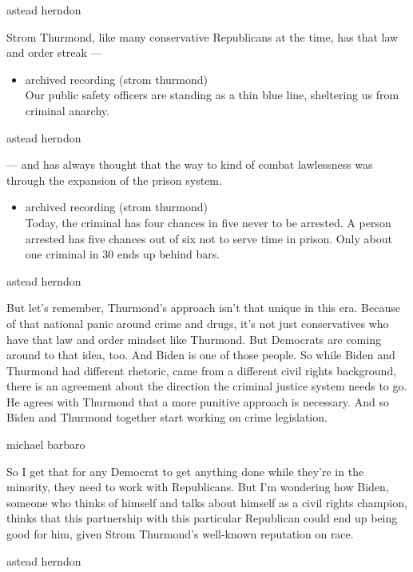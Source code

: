 astead herndon

Strom Thurmond, like many conservative Republicans at the time, has that
law and order streak ---

\begin{itemize}
\tightlist
\item
  archived recording (strom thurmond)\\
  Our public safety officers are standing as a thin blue line,
  sheltering us from criminal anarchy.
\end{itemize}

astead herndon

--- and has always thought that the way to kind of combat lawlessness
was through the expansion of the prison system.

\begin{itemize}
\tightlist
\item
  archived recording (strom thurmond)\\
  Today, the criminal has four chances in five never to be arrested. A
  person arrested has five chances out of six not to serve time in
  prison. Only about one criminal in 30 ends up behind bars.
\end{itemize}

astead herndon

But let's remember, Thurmond's approach isn't that unique in this era.
Because of that national panic around crime and drugs, it's not just
conservatives who have that law and order mindset like Thurmond. But
Democrats are coming around to that idea, too. And Biden is one of those
people. So while Biden and Thurmond had different rhetoric, came from a
different civil rights background, there is an agreement about the
direction the criminal justice system needs to go. He agrees with
Thurmond that a more punitive approach is necessary. And so Biden and
Thurmond together start working on crime legislation.

michael barbaro

So I get that for any Democrat to get anything done while they're in the
minority, they need to work with Republicans. But I'm wondering how
Biden, someone who thinks of himself and talks about himself as a civil
rights champion, thinks that this partnership with this particular
Republican could end up being good for him, given Strom Thurmond's
well-known reputation on race.

astead herndon

